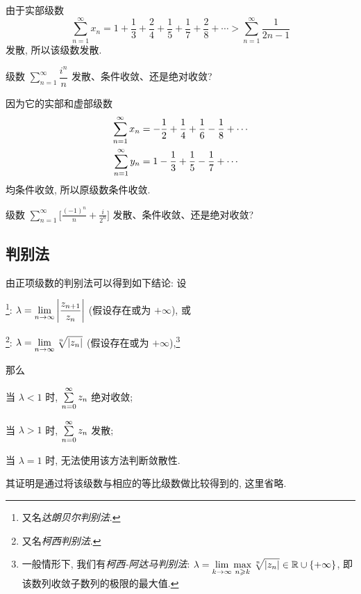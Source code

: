 \begin{solution}
	由于实部级数
	\[
		\sum_{n=1}^\infty x_n
		=1+\frac13+\frac24+\frac15+\frac17+\frac28+\cdots
		>\sum_{n=1}^\infty\frac1{2n-1}
	\]
	发散, 所以该级数发散.
\end{solution}

\begin{example}
	级数 $\displaystyle\sum_{n=1}^\infty\dfrac{i^n}n$ 发散、条件收敛、还是绝对收敛?
\end{example}

\begin{solution}
	因为它的实部和虚部级数
	\begin{align*}
		\sum_{n=1}^\infty x_n&=-\frac{1}{2} +\frac14+\frac16-\frac18+\cdots\\
		\sum_{n=1}^\infty y_n&=1-\frac13+\frac15-\frac17+\cdots
	\end{align*}
	均条件收敛, 所以原级数条件收敛.
\end{solution}

\begin{exercise}
	级数 $\displaystyle\sum_{n=1}^\infty\biggl[\frac{(-1)^n}n+\frac i{2^n}\biggr]$ 发散、条件收敛、还是绝对收敛?
\end{exercise}


\subsection{判别法}

由正项级数的判别法可以得到如下结论: 设
\begin{enumpar}
	\item {}\footnote{又名\emph{达朗贝尔判别法}.}: $\lambda=\displaystyle\lim_{n\to\infty}\left|\frac{z_{n+1}}{z_n}\right|$ (假设存在或为 $+\infty$), 或
	\item {}\footnote{又名\emph{柯西判别法}.}: $\lambda=\displaystyle\lim_{n\to\infty}\sqrt[n]{\left|z_n\right|}$ (假设存在或为 $+\infty$),\footnote{
		一般情形下, 我们有\emph{柯西-阿达马判别法}:  $\lambda=\displaystyle\lim_{k\to\infty}\max_{n\geqslant k}\sqrt[n]{\left|z_n\right|}\in{\mathbb{R}}\cup\{+\infty\}$, 即该数列收敛子数列的极限的最大值.}
\end{enumpar}\par\noindent
那么
\begin{itempar}
	\item 当 $\lambda<1$ 时, $\sum\limits_{n=0}^\infty z_n$ 绝对收敛;
	\item 当 $\lambda>1$ 时, $\sum\limits_{n=0}^\infty z_n$ 发散;
	\item 当 $\lambda=1$ 时, 无法使用该方法判断敛散性.
\end{itempar}\par\noindent
其证明是通过将该级数与相应的等比级数做比较得到的, 这里省略.

